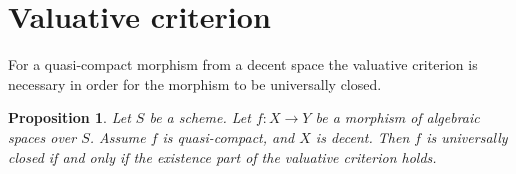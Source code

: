 \documentclass{stacks-project}
\theoremstyle{plain}
\newtheorem{proposition}[subsection]{Proposition}
\theoremstyle{definition}
\theoremstyle{remark}
\numberwithin{equation}{subsection}
\begin{document}
\section{Valuative criterion}
\label{section-valuative-criterion-universally-closed}

\noindent
For a quasi-compact morphism from a decent space the valuative
criterion is necessary in order for the morphism to be
universally closed.


\begin{proposition}
\label{proposition-characterize-universally-closed}
Let $S$ be a scheme. Let $f : X \to Y$ be a morphism of algebraic spaces
over $S$. Assume $f$ is quasi-compact, and $X$ is decent. Then $f$ is
universally closed if and only if the existence part of the valuative
criterion holds.
\end{proposition}
\end{document}
